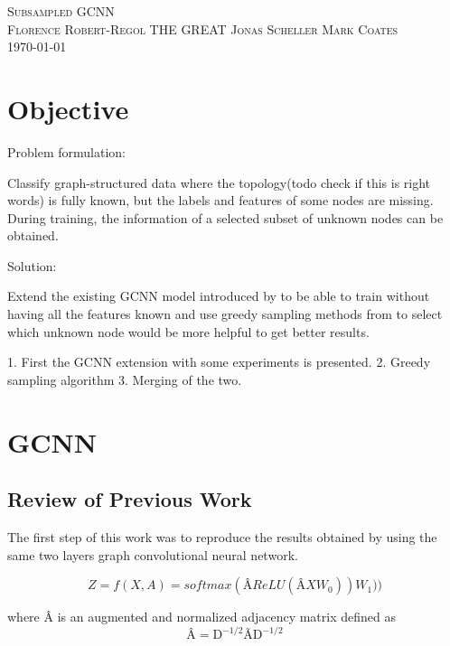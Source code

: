 \documentclass{article}
\begin{document}

		
	\begin{center}

		\textsc{\huge Subsampled GCNN}\\[0.5cm] 
		\textsc{\large Florence Robert-Regol \hfill THE GREAT Jonas Scheller  \hfill Mark Coates}\\
		\textsc{\today}\\[0.5cm] 
		
	\end{center}


\pagestyle{fancy}
\rhead{\today}

\section*{Objective}
Problem formulation:

Classify graph-structured data where the topology(todo check if this is right words) is fully known, but  the labels and features of some nodes are missing. During training, the information of a selected subset of unknown nodes can be obtained.\

Solution:

Extend the existing GCNN model introduced by \citet{kipf2017semi}
 to be able to train without having all the features known and use greedy sampling methods from \citet{DBLP:journals/corr/ChamonR17}
 to select which unknown node would be more helpful to get better results. \
 
1. First the GCNN extension with some experiments is presented. 2. Greedy sampling algorithm  
3. Merging of the two.

\section*{GCNN}
\subsection*{Review of Previous Work}
The first step of this work was to reproduce the results obtained by \citet{kipf2017semi} using the same two layers graph convolutional neural network.

\begin{equation}
Z = f(X, A) = softmax(\text{\^{A}} ReLU(\text{\^{A}}XW_0))W_1))
\end{equation}

where \^{A} is an augmented and normalized adjacency matrix defined as
\begin{equation}
\text{\^{A}} = \text{\~{D}}^{-1/2}\text{\~{A}}\text{\~{D}}^{-1/2}
\end{equation}
\end{document}
